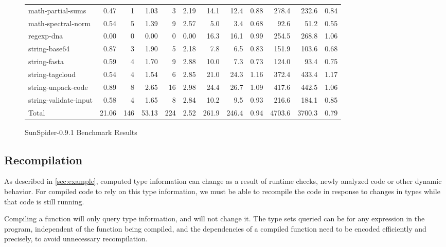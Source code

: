 \begin{figure*}[ht]
\begin{tabular}{lrrrrrrrrrrr}
math-partial-sums        & 0.47 & 1   & 1.03 & 3  & 2.19
    & 14.1 & 12.4 & 0.88  & 278.4 & 232.6 & 0.84 \\
math-spectral-norm       & 0.54 & 5   & 1.39 & 9  & 2.57
    & 5.0  & 3.4 & 0.68   & 92.6  & 51.2  & 0.55 \\
regexp-dna               & 0.00 & 0   & 0.00 & 0    & 0.00
    & 16.3 & 16.1 & 0.99  & 254.5 & 268.8 & 1.06 \\
string-base64            & 0.87 & 3   & 1.90 & 5   & 2.18
    & 7.8  & 6.5 & 0.83   & 151.9 & 103.6 & 0.68 \\
string-fasta             & 0.59 & 4   & 1.70 & 9   & 2.88
    & 10.0 & 7.3 & 0.73   & 124.0 & 93.4  & 0.75 \\
string-tagcloud          & 0.54 & 4   & 1.54 & 6  & 2.85
    & 21.0 & 24.3 & 1.16 & 372.4 & 433.4 & 1.17 \\
string-unpack-code       & 0.89 & 8   & 2.65 & 16 & 2.98
    & 24.4 & 26.7 & 1.09 & 417.6 & 442.5 & 1.06 \\
string-validate-input    & 0.58 & 4   & 1.65 & 8  & 2.84
    & 10.2 & 9.5 & 0.93   & 216.6 & 184.1 & 0.85 \\

\midrule

Total                  & 21.06 & 146 & 53.13 & 224 & 2.52
    & 261.9 & 246.4 & 0.94 & 4703.6 & 3700.3 & 0.79 \\

\bottomrule

\end{tabular}
\nocaptionrule \caption{SunSpider-0.9.1 Benchmark Results}
\label{fig:sunspider}
\end{figure*}

\subsection{Recompilation}
\label{sec:recompilation}

As described in \Section\ref{sec:example}, computed type information can change as
a result of runtime checks, newly analyzed code or other dynamic behavior.
For compiled code to rely on this type information, we must be able
to recompile the code in response to changes in types while that code is
still running.

Compiling a function will only query type information, and will not change it.
The type sets queried can be for any expression %
in the program,
independent of the function being compiled,
and the dependencies of a compiled function need to be encoded efficiently
and precisely, to avoid unnecessary recompilation.

